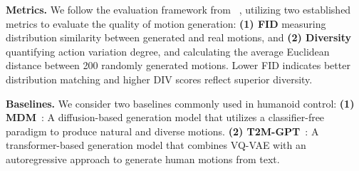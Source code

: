 \begin{table}
\centering
{}
\caption{
\textbf{Kinematic fidelity of generated motion in HumanML3D and Humanoid-S.} We use FID score and Diversity to evaluate the quality of the motion generated by the model, where bold values indicate the best results.
}
\label{tab:t2m}
\vspace{-1.5em}
\end{table}

\textbf{Metrics.}
We follow the evaluation framework from ~\cite{guo2022fid}, utilizing two established metrics to evaluate the quality of motion generation: \textbf{(1) FID} measuring distribution similarity between generated and real motions, and \textbf{(2) Diversity} quantifying action variation degree, and calculating the average Euclidean distance between 200 randomly generated motions.
Lower FID indicates better distribution matching and higher DIV scores reflect superior diversity.

\textbf{Baselines.}
We consider two baselines commonly used in humanoid control:
{\textbf{(1) MDM}~\cite{tevet2023human}}: A diffusion-based generation model that utilizes a classifier-free paradigm to produce natural and diverse motions.
{\textbf{(2) T2M-GPT}~\cite{zhang2023t2m}}: A transformer-based generation model that combines VQ-VAE\cite{van2017neural} with an autoregressive approach to generate human motions from text.


